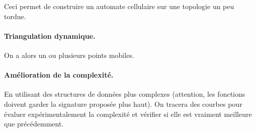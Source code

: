 \documentclass{../../../LaTeX/tdsimple}
\begin{document}
Ceci permet de construire un automate cellulaire sur une topologie un
peu tordue.

\paragraph{Triangulation dynamique.}

On a alors un ou plusieurs points mobiles.

\paragraph{Amélioration de la complexité.}

En utilisant des structures de données plus complexes (attention, les
fonctions doivent garder la signature proposée plus haut).  On tracera
des courbes pour évaluer expérimentalement la complexité et vérifier
si elle est vraiment meilleure que précédemment.
\end{document}
